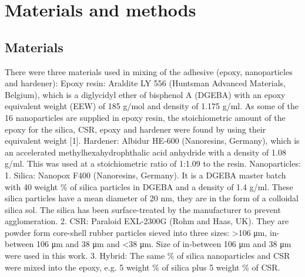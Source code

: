 \documentclass[numbers=noendperiod,chapterprefix=on]{icldt} %
\begin{document}
\section{Materials and methods}
\subsection{Materials}
There were three materials used in mixing of the adhesive (epoxy, nanoparticles and hardener):
Epoxy resin: Araldite LY 556 (Huntsman Advanced Materials, Belgium), which is a diglycidyl ether of bisphenol A (DGEBA) with an epoxy equivalent weight (EEW) of 185 g/mol and density of 1.175 g/ml. As some of the
16
nanoparticles are supplied in epoxy resin, the stoichiometric amount of the epoxy for the silica, CSR, epoxy and hardener were found by using their equivalent weight [1].
Hardener: Albidur HE-600 (Nanoresins, Germany), which is an accelerated methylhexahydrophthalic acid anhydride with a density of 1.08 g/ml. This was used at a stoichiometric ratio of 1:1.09 to the resin.
Nanoparticles:
1. Silica: Nanopox F400 (Nanoresins, Germany). It is a DGEBA master batch with 40 weight \% of silica particles in DGEBA and a density of 1.4 g/ml. These silica particles have a mean diameter of 20 nm, they are in the form of a colloidal silica sol. The silica has been surface-treated by the manufacturer to prevent agglomeration.
2. CSR: Paraloid EXL-2300G (Rohm and Haas, UK). They are powder form core-shell rubber particles sieved into three sizes: >106 μm, in-between 106 μm and 38 μm and <38 μm. Size of in-between 106 μm and 38 μm were used in this work.
3. Hybrid: The same \% of silica nanoparticles and CSR were mixed into the epoxy, e.g. 5 weight \% of silica plus 5 weight \% of CSR.
\end{document}
